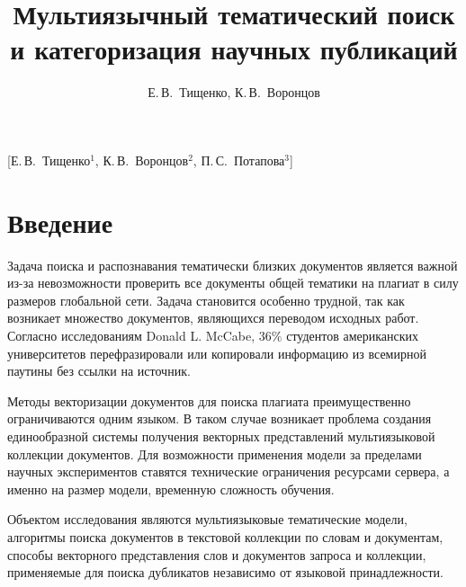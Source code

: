 \documentclass[12pt, twoside]{article}
\begin{document}
\title
    []
    {Мультиязычный тематический поиск и категоризация научных публикаций}

\author
    [Е.\,В.~Тищенко]
    {Е.\,В.~Тищенко, К.\,В.~Воронцов}
    [Е.\,В.~Тищенко$^1$, К.\,В.~Воронцов$^2$, П.\,С.~Потапова$^3$]




\maketitle
\linenumbers
\section{Введение}

Задача поиска и распознавания тематически близких документов является важной из-за невозможности проверить все документы общей тематики на плагиат в силу размеров глобальной сети. Задача становится особенно трудной, так как возникает множество документов, являющихся переводом исходных работ. Согласно исследованиям Donald L. McCabe,\cite{donaldSurvey}  $ 36\% $ студентов американских университетов перефразировали или копировали информацию из всемирной паутины без ссылки на источник. 

Методы векторизации документов для поиска плагиата  \cite{methodMLPlag, regression} преимущественно ограничиваются одним языком. В таком случае возникает проблема создания единообразной системы получения векторных представлений мультиязыковой коллекции документов. Для возможности применения модели за пределами научных экспериментов ставятся технические ограничения ресурсами сервера, а именно на размер модели, временную сложность обучения.

Объектом исследования являются мультиязыковые тематические модели, алгоритмы поиска документов в текстовой коллекции по словам и документам, способы векторного представления слов и документов запроса и коллекции, применяемые для поиска дубликатов независимо от языковой принадлежности.
\end{document}

